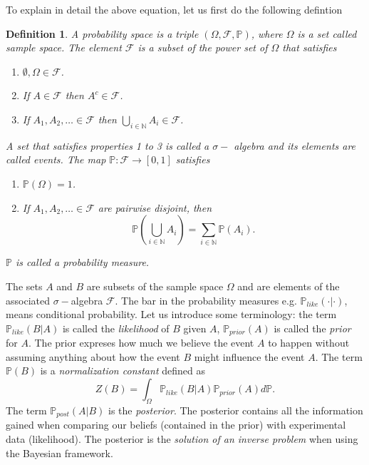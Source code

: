 \documentclass[12pt]{book}
\newtheorem{definition}{Definition}
\newcommand{\post}{\mathbb{P}_{post}}
\newcommand{\like}{\mathbb{P}_{like}}
\newcommand{\prior}{\mathbb{P}_{prior}}
\newcommand{\p}{\mathbb{P}}
\begin{document}
To explain in detail the above equation, let us first do the following defintion
\cite{dudley2002real}
\begin{definition}\label{dfnprobabilitytriple}
A probability space is a triple $(\Omega,\mathscr{F},\p)$, where $\Omega$ is a set called 
sample space.
The element $\mathscr{F}$ is a subset of the power set of $\Omega$ that satisfies
\begin{enumerate}
\item $\emptyset,\Omega\in\mathscr{F}$.
\item If $A\in\mathscr{F}$ then $A^{c}\in\mathscr{F}$.
\item If $A_{1},A_{2},\ldots \in\mathscr{F}$ then $\bigcup_{i\in\mathbb{N}}A_{i}\in\mathscr{F}$.
\end{enumerate}
A set that satisfies properties 1 to 3 is called a $\sigma-$ algebra and its elements are called
events. The map $\p:\mathscr{F}\rightarrow [0,1]$ satisfies
\begin{enumerate}
\item $\p(\Omega)=1$.
\item If $A_{1},A_{2},\ldots \in\mathscr{F}$ are pairwise disjoint, then 
\begin{equation*}
\p(\bigcup_{i\in\mathbb{N}}A_{i})=\sum_{i\in\mathbb{N}}\p(A_{i}).
\end{equation*}
\end{enumerate}
$\p$ is called a probability measure.
\end{definition}


The sets $A$ and $B$ are subsets of the sample space $\Omega$ and 
are elements of the associated $\sigma-$algebra $\mathscr{F}$. The bar in the probability
measures e.g. $\like(\cdot|\cdot)$, means conditional probability. Let us introduce some terminology:
 the term $\like(B|A)$ is called the \textit{likelihood} of $B$ given $A$, $\prior(A)$ is called the 
\textit{prior} for $A$. The prior expreses how much we believe the event $A$ to happen without assuming
anything about how the event $B$ might influence the event $A$. 
The term $\p(B)$ is a \textit{normalization constant} defined as 
\begin{equation*}
Z(B)=\int_{\Omega} \like(B|A)\prior(A)d\p.
\end{equation*}
The term $\post(A|B)$ is  the \textit{posterior}. The posterior contains all the information 
gained when comparing our beliefs (contained in the prior) with experimental data (likelihood). The posterior
is the \textit{solution of an inverse problem} when using the  Bayesian framework.
\end{document}
